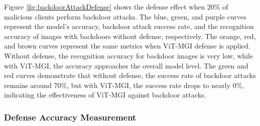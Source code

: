 \documentclass[conference]{IEEEtran}
\begin{document}

Figure \hyperref[fig:backdoorAttackDefense]{\ref{fig:backdoorAttackDefense}} shows the defense effect when 20\% of malicious clients perform backdoor attacks. The blue, green, and purple curves represent the model's accuracy, backdoor attack success rate, and the recognition accuracy of images with backdoors without defense, respectively. The orange, red, and brown curves represent the same metrics when ViT-MGI defense is applied. Without defense, the recognition accuracy for backdoor images is very low, while with ViT-MGI, the accuracy approaches the overall model level. The green and red curves demonstrate that without defense, the success rate of backdoor attacks remains around 70\%, but with ViT-MGI, the success rate drops to nearly 0\%, indicating the effectiveness of ViT-MGI against backdoor attacks.

\subsubsection{\textbf{Defense Accuracy Measurement}}
\label{exp:defense_accuracy}

\end{document}
